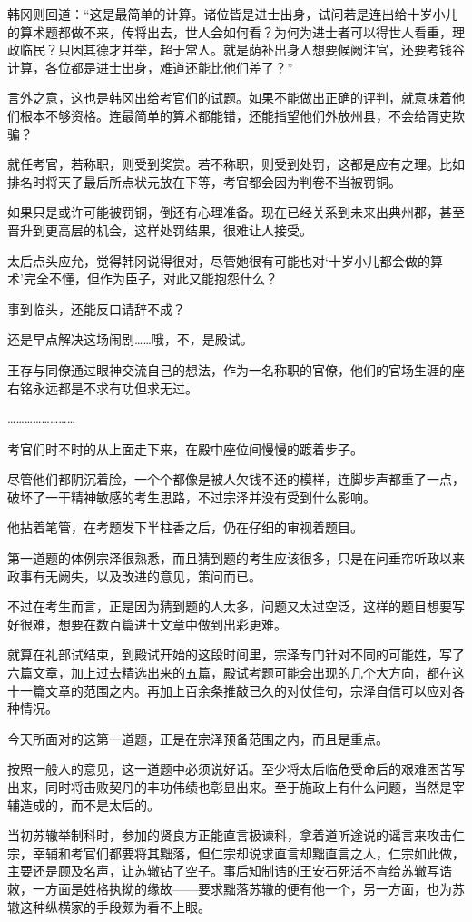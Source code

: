 韩冈则回道：“这是最简单的计算。诸位皆是进士出身，试问若是连出给十岁小儿的算术题都做不来，传将出去，世人会如何看？为何为进士者可以得世人看重，理政临民？只因其德才并举，超于常人。就是荫补出身人想要候阙注官，还要考钱谷计算，各位都是进士出身，难道还能比他们差了？”

言外之意，这也是韩冈出给考官们的试题。如果不能做出正确的评判，就意味着他们根本不够资格。连最简单的算术都能错，还能指望他们外放州县，不会给胥吏欺骗？

就任考官，若称职，则受到奖赏。若不称职，则受到处罚，这都是应有之理。比如排名时将天子最后所点状元放在下等，考官都会因为判卷不当被罚铜。

如果只是或许可能被罚铜，倒还有心理准备。现在已经关系到未来出典州郡，甚至晋升到更高层的机会，这样处罚结果，很难让人接受。

太后点头应允，觉得韩冈说得很对，尽管她很有可能也对‘十岁小儿都会做的算术’完全不懂，但作为臣子，对此又能抱怨什么？

事到临头，还能反口请辞不成？

还是早点解决这场闹剧……哦，不，是殿试。

王存与同僚通过眼神交流自己的想法，作为一名称职的官僚，他们的官场生涯的座右铭永远都是不求有功但求无过。

……………………

考官们时不时的从上面走下来，在殿中座位间慢慢的踱着步子。

尽管他们都阴沉着脸，一个个都像是被人欠钱不还的模样，连脚步声都重了一点，破坏了一干精神敏感的考生思路，不过宗泽并没有受到什么影响。

他拈着笔管，在考题发下半柱香之后，仍在仔细的审视着题目。

第一道题的体例宗泽很熟悉，而且猜到题的考生应该很多，只是在问垂帘听政以来政事有无阙失，以及改进的意见，策问而已。

不过在考生而言，正是因为猜到题的人太多，问题又太过空泛，这样的题目想要写好很难，想要在数百篇进士文章中做到出彩更难。

就算在礼部试结束，到殿试开始的这段时间里，宗泽专门针对不同的可能姓，写了六篇文章，加上过去精选出来的五篇，殿试考题可能会出现的几个大方向，都在这十一篇文章的范围之内。再加上百余条推敲已久的对仗佳句，宗泽自信可以应对各种情况。

今天所面对的这第一道题，正是在宗泽预备范围之内，而且是重点。

按照一般人的意见，这一道题中必须说好话。至少将太后临危受命后的艰难困苦写出来，同时将击败契丹的丰功伟绩也彰显出来。至于施政上有什么问题，当然是宰辅造成的，而不是太后的。

当初苏辙举制科时，参加的贤良方正能直言极谏科，拿着道听途说的谣言来攻击仁宗，宰辅和考官们都要将其黜落，但仁宗却说求直言却黜直言之人，仁宗如此做，主要还是顾及名声，让苏辙钻了空子。事后知制诰的王安石死活不肯给苏辙写诰敇，一方面是姓格执拗的缘故——要求黜落苏辙的便有他一个，另一方面，也为苏辙这种纵横家的手段颇为看不上眼。

